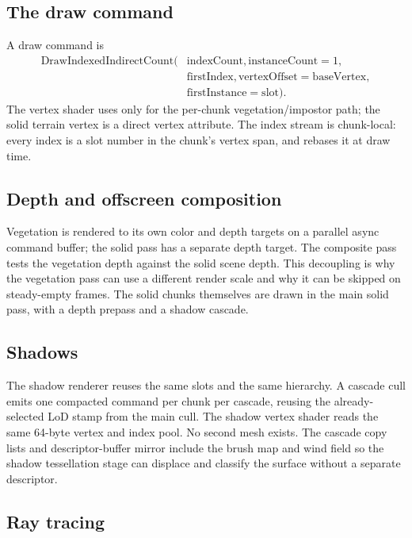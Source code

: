 \subsection{The draw command}

A draw command is
\begin{equation}
\begin{aligned}
  \text{DrawIndexedIndirectCount}(&\text{indexCount},\text{instanceCount}=1,\\
  &\text{firstIndex},\text{vertexOffset}=\text{baseVertex},\\
  &\text{firstInstance}=\text{slot}).
\end{aligned}
\end{equation}
The vertex shader uses  only for the per-chunk
vegetation/impostor path; the solid terrain vertex is a direct vertex
attribute.  The index stream is chunk-local: every index is a slot number
in the chunk's vertex span, and  rebases it at draw time.

\subsection{Depth and offscreen composition}

Vegetation is rendered to its own color and depth targets on a parallel
async command buffer; the solid pass has a separate depth target.  The
composite pass tests the vegetation depth against the solid scene depth.
This decoupling is why the vegetation pass can use a different render
scale and why it can be skipped on steady-empty frames.  The solid chunks
themselves are drawn in the main solid pass, with a depth prepass and a
shadow cascade.

\subsection{Shadows}

The shadow renderer reuses the same slots and the same hierarchy.  A
cascade cull emits one compacted command per chunk per cascade, reusing the
already-selected LoD stamp from the main cull.  The shadow vertex shader
reads the same 64-byte vertex and index pool.  No second mesh exists.
The cascade copy lists and descriptor-buffer mirror include the brush map
and wind field so the shadow tessellation stage can displace and classify
the surface without a separate descriptor.

\subsection{Ray tracing}

